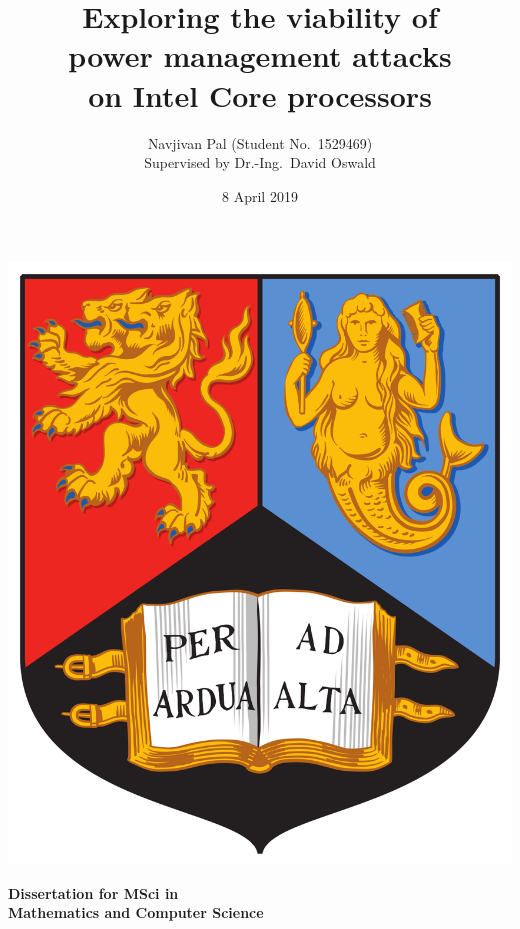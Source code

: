 



\title{Exploring the viability of\\power management attacks\\on Intel Core processors\\}
\author{Navjivan Pal (Student No.\ 1529469)\\Supervised by Dr.-Ing.\ David Oswald\\}
\date{8 April 2019}

\makeatletter
\begin{titlepage}
    \begin{center}
        \vspace*{\fill}
        \textbf{\Huge
            \@title
        }

        \vspace*{2em}
        \includegraphics[height=0.25\paperheight,keepaspectratio]{uob-crest.png}

        \vspace{1em}
        \textbf{\LARGE Dissertation for MSci in\\Mathematics and Computer Science\\}
        

\end{center}
\end{titlepage}
